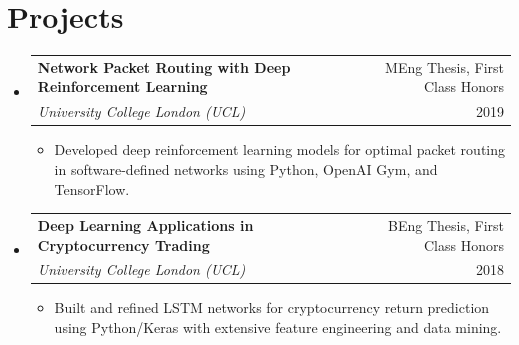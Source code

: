 \documentclass[letterpaper,11pt]{article}
\makeatletter
\newcommand{\resumeItem}[1]{
  \item\small{
    {#1 \vspace{-2pt}}
  }
}
\newcommand{\resumeSubheadingLarger}[4]{
  \vspace{-2pt}\item
    \begin{tabular*}{0.97\textwidth}[t]{l@{\extracolsep{\fill}}r}
      \textbf{\normalsize #1} & {\small #2} \\
      \textit{\small #3} & {\small #4} \\
    \end{tabular*}\vspace{-7pt}
}
\newcommand{\resumeSubHeadingListStart}{\begin{itemize}[leftmargin=0.15in, label={}]}
\newcommand{\resumeSubHeadingListEnd}{\end{itemize}}
\newcommand{\resumeItemListStart}{\begin{itemize}\setlength{\itemsep}{0pt}}
\newcommand{\resumeItemListEnd}{\end{itemize}\vspace{-5pt}}
\makeatother
\begin{document}
\section{Projects}
    \resumeSubHeadingListStart
      \resumeSubheadingLarger
        {Network Packet Routing with Deep Reinforcement Learning}{MEng Thesis, First Class Honors}
        {University College London (UCL)}{2019}
        \resumeItemListStart
          \resumeItem{Developed deep reinforcement learning models for optimal packet routing in software-defined networks using Python, OpenAI Gym, and TensorFlow.}
        \resumeItemListEnd
      \resumeSubheadingLarger
        {Deep Learning Applications in Cryptocurrency Trading}{BEng Thesis, First Class Honors}
        {University College London (UCL)}{2018}
        \resumeItemListStart
          \resumeItem{Built and refined LSTM networks for cryptocurrency return prediction using Python/Keras with extensive feature engineering and data mining.}
        \resumeItemListEnd
    \resumeSubHeadingListEnd

\end{document}
